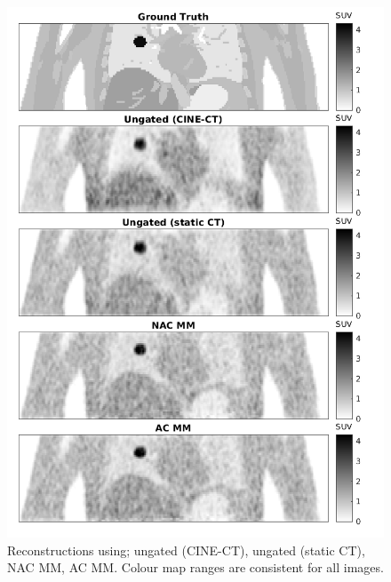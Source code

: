     \begin{figure}
        \vspace{-0.5cm}
        \centering
        \includegraphics[width=0.9\linewidth]{figures/visual_analysis.png}
        \captionsetup{singlelinecheck=false, justification=centering}
        \caption{Reconstructions using; ungated (CINE-\gls{CT}), ungated (static \gls{CT}), \gls{NAC} \gls{MM}, \gls{AC} \gls{MM}. Colour map ranges are consistent for all images.}
        \label{fig:visual_analysis}
        \vspace{-0.5cm}
    \end{figure}
    
